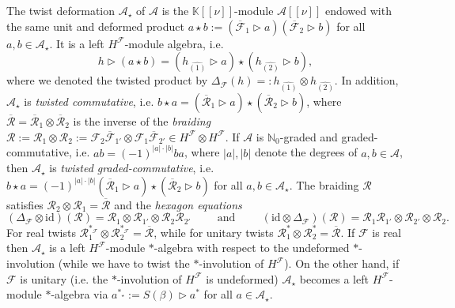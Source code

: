 \documentclass[a4paper,11pt]{article}
\begin{document}
The twist deformation $\mathcal{A}_\star$ of $\mathcal{A}$ is the 
$\mathbb{K}[[\nu]]$-module $\mathcal{A}[[\nu]]$ endowed with the same unit and deformed
product $a\star b:=(\overline{\mathcal{F}}_1\rhd a)(\overline{\mathcal{F}}_2\rhd b)$
for all $a,b\in\mathcal{A}_\star$. It is a left $H^\mathcal{F}$-module algebra, i.e.
\begin{equation}
    h\rhd(a\star b)=(h_{\widehat{(1)}}\rhd a)\star(h_{\widehat{(2)}}\rhd b),
\end{equation}
where we denoted the twisted product by $\Delta_\mathcal{F}(h)=:
h_{\widehat{(1)}}\otimes h_{\widehat{(2)}}$. In addition, $\mathcal{A}_\star$ is
\textit{twisted commutative}, i.e. $b\star a
=(\overline{\mathcal{R}}_1\rhd a)\star(\overline{\mathcal{R}}_2\rhd b)$, where
$\overline{\mathcal{R}}=\overline{\mathcal{R}}_1\otimes\overline{\mathcal{R}}_2$
is the inverse of the \textit{braiding}
$\mathcal{R}:=\mathcal{R}_1\otimes\mathcal{R}_2:=\mathcal{F}_2\overline{\mathcal{F}}_{1'}
\otimes\mathcal{F}_1\overline{\mathcal{F}}_{2'}\in H^\mathcal{F}\otimes H^\mathcal{F}$.
If $\mathcal{A}$ is $\mathbb{N}_0$-graded and graded-commutative,
i.e. $ab=(-1)^{|a|\cdot|b|}ba$, where $|a|,|b|$ denote the degrees of $a,b\in\mathcal{A}$, then $\mathcal{A}_\star$ is \textit{twisted graded-commutative}, i.e. $b\star a
=(-1)^{|a|\cdot|b|}(\overline{\mathcal{R}}_1\rhd a)\star(\overline{\mathcal{R}}_2\rhd b)$ for all $a,b\in\mathcal{A}_\star$.
The braiding $\mathcal{R}$ satisfies $\mathcal{R}_2\otimes\mathcal{R}_1=\overline{\mathcal{R}}$ 
and
the \textit{hexagon equations}
\begin{equation}
    (\Delta_\mathcal{F}\otimes\mathrm{id})(\mathcal{R})=\mathcal{R}_1\otimes\mathcal{R}_{1'}
    \otimes\mathcal{R}_2\mathcal{R}_{2'}
    \hspace{1cm}\text{and}\hspace{1cm}
    (\mathrm{id}\otimes\Delta_\mathcal{F})(\mathcal{R})=\mathcal{R}_1\mathcal{R}_{1'}
    \otimes\mathcal{R}_{2'}\otimes\mathcal{R}_2.
\end{equation}
For real twists $\mathcal{R}_1^{*_\mathcal{F}}\otimes\mathcal{R}_2^{*_\mathcal{F}}
=\overline{\mathcal{R}}$, while for unitary twists $\mathcal{R}_1^*\otimes\mathcal{R}_2^*
=\overline{\mathcal{R}}$. If $\mathcal{F}$ is real then 
$\mathcal{A}_\star$ is a left $H^\mathcal{F}$-module $*$-algebra with respect to the
undeformed $*$-involution (while we have to twist the $*$-involution of $H^\mathcal{F}$).
On the other hand, if $\mathcal{F}$ is unitary (i.e. the $*$-involution of 
$H^\mathcal{F}$ is undeformed) $\mathcal{A}_\star$ becomes a
left $H^\mathcal{F}$-module 
$*$-algebra via $a^{*_\star}:=S(\beta)\rhd a^*$ for all $a\in\mathcal{A}_\star$.
\end{document}
